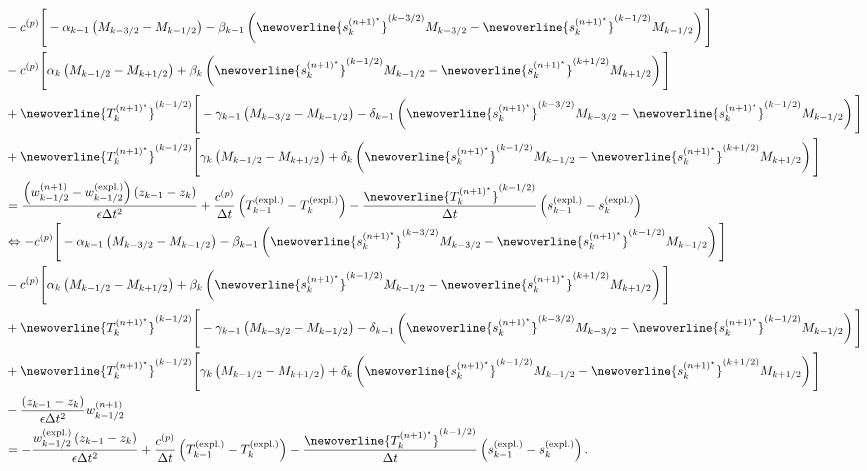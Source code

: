 \begin{align}
&-c^{(p)}\Bigg[-\alpha_{k - 1}\left(M_{k - 3/2} - M_{k - 1/2}\right) - \beta_{k - 1}\left(\newoverline{s_k^{(n + 1)^\star}}^{(k - 3/2)}M_{k - 3/2} - \newoverline{s_k^{(n + 1)^\star}}^{(k - 1/2)}M_{k - 1/2}\right)\Bigg]\nonumber\\
&-c^{(p)}\Bigg[\alpha_k\left(M_{k - 1/2} - M_{k + 1/2}\right) + \beta_k\left(\newoverline{s_k^{(n + 1)^\star}}^{(k - 1/2)}M_{k - 1/2} - \newoverline{s_k^{(n + 1)^\star}}^{(k + 1/2)}M_{k + 1/2}\right)\Bigg]\nonumber\\
&+ \newoverline{T_k^{(n + 1)^\star}}^{(k - 1/2)}\Bigg[-\gamma_{k - 1}\left(M_{k - 3/2} - M_{k - 1/2}\right) - \delta_{k - 1}\left(\newoverline{s_k^{(n + 1)^\star}}^{(k - 3/2)}M_{k - 3/2} - \newoverline{s_k^{(n + 1)^\star}}^{(k - 1/2)}M_{k - 1/2}\right)\Bigg]\nonumber\\
&+ \newoverline{T_k^{(n + 1)^\star}}^{(k - 1/2)}\Bigg[\gamma_k\left(M_{k - 1/2} - M_{k + 1/2}\right) + \delta_k\left(\newoverline{s_k^{(n + 1)^\star}}^{(k - 1/2)}M_{k - 1/2} - \newoverline{s_k^{(n + 1)^\star}}^{(k + 1/2)}M_{k + 1/2}\right)\Bigg]\nonumber\\
&=\frac{\left(w_{k - 1/2}^{(n + 1)} - w_{k - 1/2}^{(\text{expl.})}\right)\left(z_{k - 1} - z_k\right)}{\epsilon\Delta t^2} + \frac{c^{(p)}}{\Delta t}\left(T^{(\text{expl.})}_{k - 1} - T^{(\text{expl.})}_{k}\right) - \frac{\newoverline{T_k^{(n + 1)^\star}}^{(k - 1/2)}}{\Delta t}\left(s^{(\text{expl.})}_{k - 1} - s^{(\text{expl.})}_k\right)\nonumber\\
&\Leftrightarrow-c^{(p)}\Bigg[-\alpha_{k - 1}\left(M_{k - 3/2} - M_{k - 1/2}\right) - \beta_{k - 1}\left(\newoverline{s_k^{(n + 1)^\star}}^{(k - 3/2)}M_{k - 3/2} - \newoverline{s_k^{(n + 1)^\star}}^{(k - 1/2)}M_{k - 1/2}\right)\Bigg]\nonumber\\
&-c^{(p)}\Bigg[\alpha_k\left(M_{k - 1/2} - M_{k + 1/2}\right) + \beta_k\left(\newoverline{s_k^{(n + 1)^\star}}^{(k - 1/2)}M_{k - 1/2} - \newoverline{s_k^{(n + 1)^\star}}^{(k + 1/2)}M_{k + 1/2}\right)\Bigg]\nonumber\\
&+ \newoverline{T_k^{(n + 1)^\star}}^{(k - 1/2)}\Bigg[-\gamma_{k - 1}\left(M_{k - 3/2} - M_{k - 1/2}\right) - \delta_{k - 1}\left(\newoverline{s_k^{(n + 1)^\star}}^{(k - 3/2)}M_{k - 3/2} - \newoverline{s_k^{(n + 1)^\star}}^{(k - 1/2)}M_{k - 1/2}\right)\Bigg]\nonumber\\
&+ \newoverline{T_k^{(n + 1)^\star}}^{(k - 1/2)}\Bigg[\gamma_k\left(M_{k - 1/2} - M_{k + 1/2}\right) + \delta_k\left(\newoverline{s_k^{(n + 1)^\star}}^{(k - 1/2)}M_{k - 1/2} - \newoverline{s_k^{(n + 1)^\star}}^{(k + 1/2)}M_{k + 1/2}\right)\Bigg]\nonumber\\
&- \frac{\left(z_{k - 1} - z_k\right)}{\epsilon\Delta t^2}w_{k - 1/2}^{(n + 1)}\nonumber\\
&= -\frac{w_{k - 1/2}^{(\text{expl.})}\left(z_{k - 1} - z_k\right)}{\epsilon\Delta t^2} + \frac{c^{(p)}}{\Delta t}\left(T^{(\text{expl.})}_{k - 1} - T^{(\text{expl.})}_{k}\right) - \frac{\newoverline{T_k^{(n + 1)^\star}}^{(k - 1/2)}}{\Delta t}\left(s^{(\text{expl.})}_{k - 1} - s^{(\text{expl.})}_k\right).\label{eq:vert_solver_pre_0}
\end{align}
